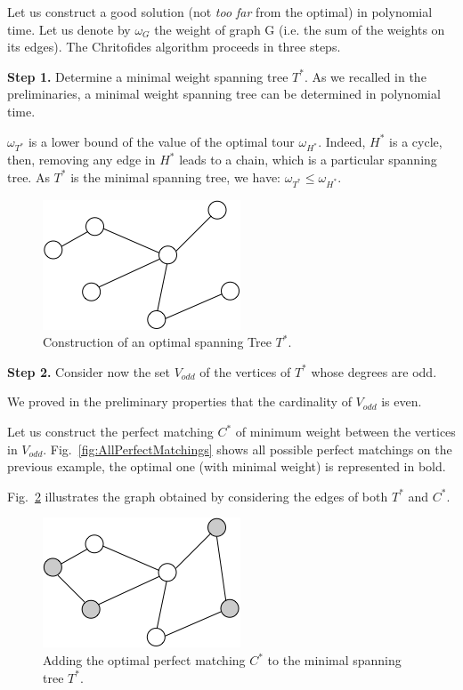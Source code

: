 {Let us construct a good solution (not \textit{too far} from the optimal) in polynomial time. 
Let us denote by $\omega_G$ the weight of graph G (i.e. the sum of the weights on its edges). 
The Chritofides algorithm proceeds in three steps. 
\bigskip

\textbf{Step 1.} Determine a minimal weight spanning tree $T^*$. 
As we recalled in the preliminaries, a minimal weight spanning tree can be determined in polynomial time. 
\bigskip

$\omega_{T^*}$ is a lower bound of the value of the optimal tour $\omega_{H^*}$. 
Indeed, $H^*$ is a cycle, then, removing any edge in $H^*$ leads to a chain, which is a particular spanning tree.
As $T^*$ is the minimal spanning tree, we have:
$\omega_{T^*} \leq \omega_{H^*}$.

\begin{figure}[hbt]
\begin{center}
       \includegraphics[scale=0.6]{FiguresGraph/christofides2}
       \caption{Construction of an optimal spanning Tree $T^*$.}
              \label{fig:christofidesSpanningTree}
\end{center}
\end{figure}


\textbf{Step 2.} Consider now the set $V_{odd}$ of the vertices of $T^*$ whose degrees are odd. 

We proved in the preliminary properties that the cardinality of $V_{odd}$ is even. 

Let us construct the perfect matching $C^*$ of minimum weight between the vertices in $V_{odd}$. 
Fig.~\ref{fig:AllPerfectMatchings} shows all possible perfect matchings on the previous example, the optimal one (with minimal weight) is represented in bold. 

Fig.~\ref{fig:christofidesPerfectMatching} illustrates the graph obtained by considering the edges of both $T^*$ and $C^*$. 
\begin{figure}[hbt]
\begin{center}
       \includegraphics[scale=0.6]{FiguresGraph/christofides3}
       \caption{Adding the optimal perfect matching $C^*$ to the minimal spanning tree $T^*$.}
              \label{fig:christofidesPerfectMatching}
\end{center}
\end{figure}

}

